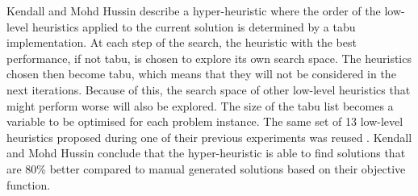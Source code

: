 Kendall and Mohd Hussin \cite{kendall2004} describe a hyper-heuristic where the order of the low-level heuristics applied to the current solution is determined by a \acrlong{tabu} implementation. At each step of the search, the heuristic with the best performance, if not tabu, is chosen to explore its own search space. The heuristics chosen then become tabu, which means that they will not be considered in the next iterations. Because of this, the search space of other low-level heuristics that might perform worse will also be explored. The size of the tabu list becomes a variable to be optimised for each problem instance. The same set of 13 low-level heuristics proposed during one of their previous experiments was reused \cite{kendall2005}. Kendall and Mohd Hussin conclude that the hyper-heuristic is able to find solutions that are 80\% better compared to manual generated solutions based on their objective function.



